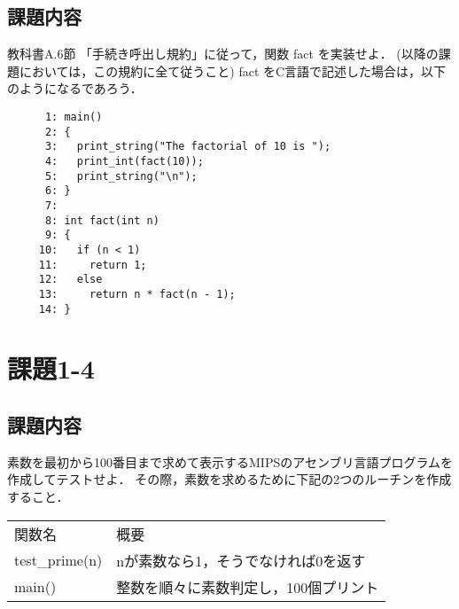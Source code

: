 \documentclass[a4j,11pt]{jarticle}
\begin{document}
\subsection{課題内容}
教科書A.6節 「手続き呼出し規約」に従って，関数 fact を実装せよ．
(以降の課題においては，この規約に全て従うこと) fact をC言語で記述した場合は，以下のようになるであろう．
\begin{verbatim}
      1: main()
      2: {
      3:   print_string("The factorial of 10 is ");
      4:   print_int(fact(10));
      5:   print_string("\n");
      6: }
      7: 
      8: int fact(int n)
      9: {
     10:   if (n < 1)
     11:     return 1;
     12:   else
     13:     return n * fact(n - 1);
     14: }
\end{verbatim}




\section{課題1-4}
\subsection{課題内容}
素数を最初から100番目まで求めて表示するMIPSのアセンブリ言語プログラムを作成してテストせよ． 
その際，素数を求めるために下記の2つのルーチンを作成すること．

\begin{table}[]
      \begin{tabular}{ll}
      関数名            & 概要                   \\
      test\_prime(n) & nが素数なら1，そうでなければ0を返す  \\
      main()         & 整数を順々に素数判定し，100個プリント
      \end{tabular}
      \end{table}


\end{document}
